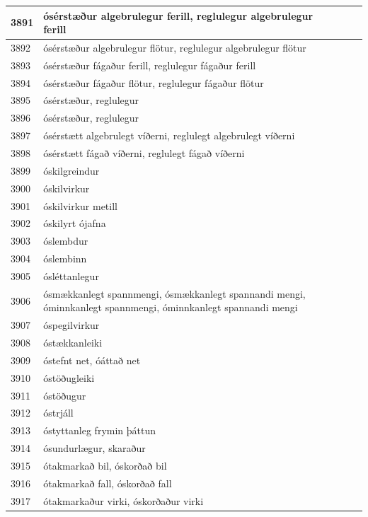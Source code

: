 \begin{longtable}{p{}|p{}|p{}|p{}|p{}}
\hline
3891 & ósérstæður algebrulegur ferill, reglulegur algebrulegur ferill &  &  &  \\
\hline
3892 & ósérstæður algebrulegur flötur, reglulegur algebrulegur flötur &  &  &  \\
\hline
3893 & ósérstæður fágaður ferill, reglulegur fágaður ferill &  &  &  \\
\hline
3894 & ósérstæður fágaður flötur, reglulegur fágaður flötur &  &  &  \\
\hline
3895 & ósérstæður, reglulegur &  &  &  \\
\hline
3896 & ósérstæður, reglulegur &  &  &  \\
\hline
3897 & ósérstætt algebrulegt víðerni, reglulegt algebrulegt víðerni &  &  &  \\
\hline
3898 & ósérstætt fágað víðerni, reglulegt fágað víðerni &  &  &  \\
\hline
3899 & óskilgreindur &  &  &  \\
\hline
3900 & óskilvirkur &  &  &  \\
\hline
3901 & óskilvirkur metill &  &  &  \\
\hline
3902 & óskilyrt ójafna &  &  &  \\
\hline
3903 & óslembdur &  &  &  \\
\hline
3904 & óslembinn &  &  &  \\
\hline
3905 & ósléttanlegur &  &  &  \\
\hline
3906 & ósmækkanlegt spannmengi, ósmækkanlegt spannandi mengi, óminnkanlegt spannmengi, óminnkanlegt spannandi mengi &  &  &  \\
\hline
3907 & óspegilvirkur &  &  &  \\
\hline
3908 & óstækkanleiki &  &  &  \\
\hline
3909 & óstefnt net, óáttað net &  &  &  \\
\hline
3910 & óstöðugleiki &  &  &  \\
\hline
3911 & óstöðugur &  &  &  \\
\hline
3912 & óstrjáll &  &  &  \\
\hline
3913 & óstyttanleg frymin þáttun &  &  &  \\
\hline
3914 & ósundurlægur, skaraður &  &  &  \\
\hline
3915 & ótakmarkað bil, óskorðað bil &  &  &  \\
\hline
3916 & ótakmarkað fall, óskorðað fall &  &  &  \\
\hline
3917 & ótakmarkaður virki, óskorðaður virki &  &  &  \\

\end{longtable}
